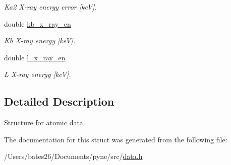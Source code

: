 \begin{DoxyCompactItemize}
\begin{DoxyCompactList}\small\item\em Ka2 X-\/ray energy error \mbox{[}ke\+V\mbox{]}. \end{DoxyCompactList}\item 
\hypertarget{structpyne_1_1atomic_aa93013778d65dc071c27564449e351de}{double \hyperlink{structpyne_1_1atomic_aa93013778d65dc071c27564449e351de}{kb\+\_\+x\+\_\+ray\+\_\+en}}\label{structpyne_1_1atomic_aa93013778d65dc071c27564449e351de}

\begin{DoxyCompactList}\small\item\em Kb X-\/ray energy \mbox{[}ke\+V\mbox{]}. \end{DoxyCompactList}\item 
\hypertarget{structpyne_1_1atomic_a43e9e36e9b5bd8e4e77ffbe86b5ef28d}{double \hyperlink{structpyne_1_1atomic_a43e9e36e9b5bd8e4e77ffbe86b5ef28d}{l\+\_\+x\+\_\+ray\+\_\+en}}\label{structpyne_1_1atomic_a43e9e36e9b5bd8e4e77ffbe86b5ef28d}

\begin{DoxyCompactList}\small\item\em L X-\/ray energy \mbox{[}ke\+V\mbox{]}. \end{DoxyCompactList}\end{DoxyCompactItemize}


\subsection{Detailed Description}
Structure for atomic data. 

The documentation for this struct was generated from the following file\+:\begin{DoxyCompactItemize}
\item 
/\+Users/bates26/\+Documents/pyne/src/\hyperlink{data_8h}{data.\+h}\end{DoxyCompactItemize}
